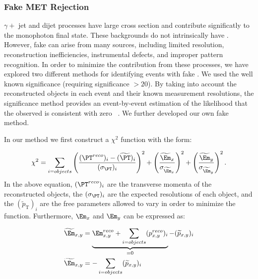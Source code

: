 \subsubsection{Fake MET Rejection}
\label{sec:fakemet}
$\gamma + $ jet and dijet processes have large cross section and contribute significatly to the monophoton final state.  These backgrounds do not intrinsically have \met. However, fake \met can arise from many sources, including limited \met resolution, reconstruction inefficiencies, instrumental defects, and improper pattern recognition. In order to minimize the contribution from these processes, we have explored two different methods for identifying events with fake \met. We used the well known \met significance (requiring \met significance $> 20$). By taking into account the reconstructed objects in each event and their known measurement resolutions, the \met significance method provides an event-by-event estimation of the likelihood that the observed \met is consistent with zero ~\cite{Chatrchyan:2011tn}. We further developed our own fake \met method. 

In our method we first construct a $\chi^2$ function with the form:
 
\begin{equation}\label{eq:1a}
   \chi^2 = \sum_{i=objects} \left( \frac{(\PT^{reco})_i-(\widetilde{\PT})_i}{(\sigma_{\PT})_i} \right)^2 + \left( \frac{\widetilde{\Em}_x}{\sigma_{\widetilde{\Em}_x}}\right)^2  + \left( \frac{\widetilde{\Em}_y}{\sigma_{\widetilde{\Em}_y}}\right)^2.
\end{equation} 
In the above equation, $(\PT^{reco})_{i}$ are the transverse  momenta of the reconstructed objects, the $(\sigma_{\PT})_{i}$ are the expected resolutions of each object, and the
$(\widetilde{p}_{\mathrm T})_{i}$ are the free parameters allowed to vary in order to minimize the function. Furthermore, $\Em_x$ and $\Em_y$ can be expressed as:
  

\begin{equation}
\begin{split}
\widetilde{\Em}_{x,y} &=  \underbrace{\Em^{reco}_{x,y} + \sum_{i=objects} (p_{x,y}^{reco})_i}_\text{=0} - (\widetilde{p}_{x,y})_i \\
\widetilde{\Em}_{x,y} &=  - \sum_{i=objects} (\widetilde{p}_{x,y})_i
\end{split}
\end{equation}


